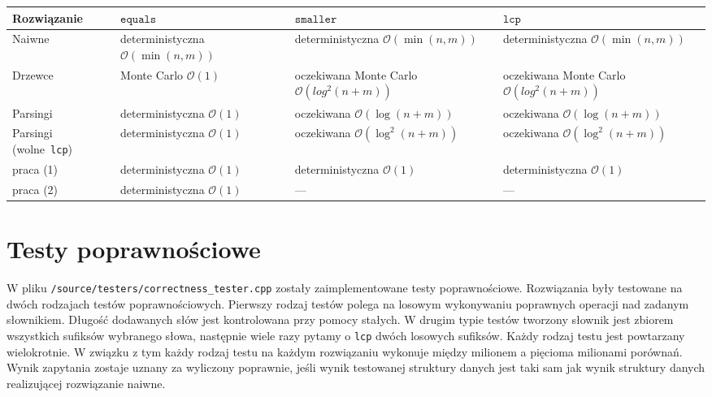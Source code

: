 \documentclass[declaration,shortabstract]{iithesis}
\theoremstyle{definition} \newtheorem{definition}{Definicja}[chapter]
\theoremstyle{remark} \newtheorem{remark}[definition]{Obserwacja}
\theoremstyle{plain} \newtheorem{theorem}[definition]{Twierdzenie}
\theoremstyle{remark} \newtheorem{example}{Przykład}[definition]
\theoremstyle{plain} \newtheorem{lemma}[definition]{Lemat}
\begin{document}
\begin{center}
    \begin{tabular}{ | m{3cm} | >{\centering\arraybackslash}m{3cm} | >{\centering\arraybackslash}m{3cm} | >{\centering\arraybackslash}m{3cm} | }
        \hline 
        Rozwiązanie & $\texttt{equals}$ & $\texttt{smaller}$ & $\texttt{lcp}$ \\
        \hline
        Naiwne & deterministyczna $\mathcal{O}(\min(n, m))$ & deterministyczna $\mathcal{O}(\min(n, m))$ & deterministyczna $\mathcal{O}(\min(n, m))$ \\
        \hline
        Drzewce & Monte Carlo $\mathcal{O}(1)$ & oczekiwana Monte Carlo $\mathcal{O}(log^2(n + m))$ & oczekiwana Monte Carlo $\mathcal{O}(log^2(n + m))$ \\
        \hline
        Parsingi & deterministyczna $\mathcal{O}(1)$ & oczekiwana $\mathcal{O}(\log(n + m))$ & oczekiwana $\mathcal{O}(\log(n + m))$ \\
        \hline
        Parsingi (wolne~\texttt{lcp}) & deterministyczna $\mathcal{O}(1)$ & oczekiwana $\mathcal{O}(\log^2(n + m))$ & oczekiwana $\mathcal{O}(\log^2(n + m))$ \\
        \hline
        praca (1) & deterministyczna $\mathcal{O}(1)$ & deterministyczna $\mathcal{O}(1)$ & deterministyczna $\mathcal{O}(1)$ \\
        \hline
        praca (2) & deterministyczna $\mathcal{O}(1)$ & --- & ---\\
        \hline
    \end{tabular}
\end{center}

\section{Testy poprawnościowe}

W pliku \texttt{/source/testers/correctness\_tester.cpp} zostały zaimplementowane testy poprawnościowe. Rozwiązania były testowane na dwóch rodzajach testów poprawnościowych. Pierwszy rodzaj testów polega na losowym wykonywaniu poprawnych operacji nad zadanym słownikiem. Długość dodawanych słów jest kontrolowana przy pomocy stałych. W drugim typie testów tworzony słownik jest zbiorem wszystkich sufiksów wybranego słowa, następnie wiele razy pytamy o \texttt{lcp} dwóch losowych sufiksów. Każdy rodzaj testu jest powtarzany wielokrotnie. W związku z tym każdy rodzaj testu na każdym rozwiązaniu wykonuje między milionem a pięcioma milionami porównań. Wynik zapytania zostaje uznany za wyliczony poprawnie, jeśli wynik testowanej struktury danych jest taki sam jak wynik struktury danych realizującej rozwiązanie naiwne.
\end{document}
